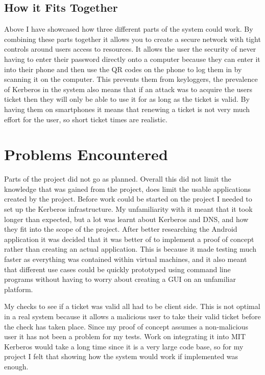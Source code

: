 \documentclass[]{report}   %
\begin{document}
\subsection{How it Fits Together}

Above I have showcased how three different parts of the system could work. By combining these parts together it allows you to create a secure network with tight controls around users access to resources. It allows the user the security of never having to enter their password directly onto a computer because they can enter it into their phone and then use the QR codes on the phone to log them in by scanning it on the computer. This prevents them from keyloggers, the prevalence of Kerberos in the system also means that if an attack was to acquire the users ticket then they will only be able to use it for as long as the ticket is valid. By having them on smartphones it means that renewing a ticket is not very much effort for the user, so short ticket times are realistic.



\section{Problems Encountered}
Parts of the project did not go as planned. Overall this did not limit the knowledge that was gained from the project, does limit the usable applications created by the project. Before work could be started on the project I needed to set up the Kerberos infrastructure. My unfamiliarity with it meant that it took longer than expected, but a lot was learnt about Kerberos and DNS, and how they fit into the scope of the project. After better researching the Android application it was decided that it was better of to implement a proof of concept rather than creating an actual application. This is because it made testing much faster as everything was contained within virtual machines, and it also meant that different use cases could be quickly prototyped using command line programs without having to worry about creating a GUI on an unfamiliar platform.

My checks to see if a ticket was valid all had to be client side. This is not optimal in a real system because it allows a malicious user to take their valid ticket before the check has taken place. Since my proof of concept assumes a non-malicious user it has not been a problem for my tests. Work on integrating it into MIT Kerberos would take a long time since it is a very large code base, so for my project I felt that showing how the system would work if implemented was enough.



\end{document}
